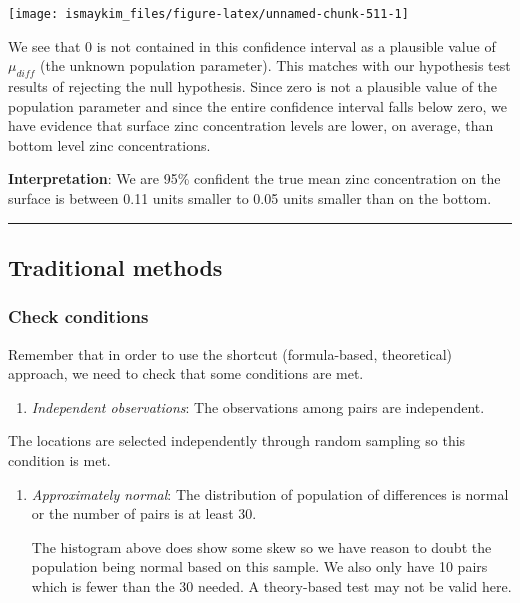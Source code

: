 \documentclass[12pt,]{krantz}
\providecommand{\tightlist}{%
  \setlength{\itemsep}{0pt}\setlength{\parskip}{0pt}}
\theoremstyle{definition}
\theoremstyle{definition}
\theoremstyle{definition}
\theoremstyle{remark}
\begin{document}
\begin{center}\texttt{[image: ismaykim\_files/figure-latex/unnamed-chunk-511-1]} \end{center}

We see that 0 is not contained in this confidence interval as a
plausible value of \(\mu_{diff}\) (the unknown population parameter).
This matches with our hypothesis test results of rejecting the null
hypothesis. Since zero is not a plausible value of the population
parameter and since the entire confidence interval falls below zero, we
have evidence that surface zinc concentration levels are lower, on
average, than bottom level zinc concentrations.

\textbf{Interpretation}: We are 95\% confident the true mean zinc
concentration on the surface is between 0.11 units smaller to 0.05 units
smaller than on the bottom.

\begin{center}\rule{0.5\linewidth}{\linethickness}\end{center}

\subsection{Traditional methods}\label{traditional-methods-4}

\subsubsection*{Check conditions}\label{check-conditions-4}


Remember that in order to use the shortcut (formula-based, theoretical)
approach, we need to check that some conditions are met.

\begin{enumerate}
\def\labelenumi{\arabic{enumi}.}
\tightlist
\item
  \emph{Independent observations}: The observations among pairs are
  independent.
\end{enumerate}

The locations are selected independently through random sampling so this
condition is met.

\begin{enumerate}
\def\labelenumi{\arabic{enumi}.}
\setcounter{enumi}{1}
\item
  \emph{Approximately normal}: The distribution of population of
  differences is normal or the number of pairs is at least 30.

  The histogram above does show some skew so we have reason to doubt the
  population being normal based on this sample. We also only have 10
  pairs which is fewer than the 30 needed. A theory-based test may not
  be valid here.
\end{enumerate}
\end{document}
